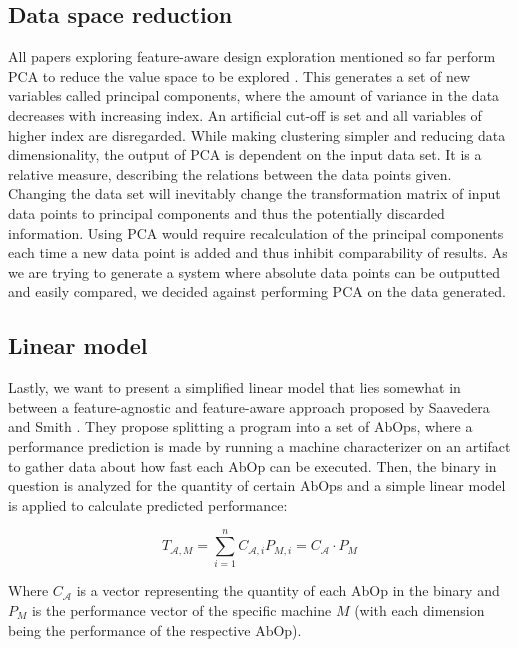 \documentclass[../bachelor_paper.tex]{subfiles}
\begin{document}
\subsection{Data space reduction}
All papers exploring feature-aware design exploration mentioned so far perform \acl{PCA} to reduce the value space to be explored \cite{phansalkarMeasuringProgramSimilarity2005,joshiMeasuringBenchmarkSimilarity2006,eeckhoutQuantifyingImpactInput2003}. This generates a set of new variables called principal components, where the amount of variance in the data decreases with increasing index. An artificial cut-off is set and all variables of higher index are disregarded. While making clustering simpler and reducing data dimensionality, the output of \ac{PCA} is dependent on the input data set. It is a relative measure, describing the relations between the data points given.  Changing the data set will inevitably change the transformation matrix of input data points to principal components and thus the potentially discarded information. Using \ac{PCA} would require recalculation of the principal components each time a new data point is added and thus inhibit comparability of results. As we are trying to generate a system where absolute data points can be outputted and easily compared, we decided against performing \ac{PCA} on the data generated.

\subsection{Linear model}
Lastly, we want to present a simplified linear model that lies somewhat in between a feature-agnostic and feature-aware approach proposed by Saavedera and Smith \cite{saavedraAnalysisBenchmarkCharacteristics1996}. They propose splitting a program into a set of \acp{AbOp}, where a performance prediction is made by running a machine characterizer on an artifact to gather data about how fast each \ac{AbOp} can be executed. Then, the binary in question is analyzed for the quantity of certain \acp{AbOp} and a simple linear model is applied to calculate predicted performance:

\begin{equation}
\label{eq:theo/simi/hybr/mode}
T_{\mathcal{A},M} = \sum^n_{i = 1}C_{\mathcal{A},i}P_{M,i} = C_\mathcal{A} \cdot P_M
\end{equation}

Where $C_{\mathcal{A}}$ is a vector representing the quantity of each \ac{AbOp} in the binary and $P_{M}$ is the performance vector of the specific machine $M$ (with each dimension being the performance of the respective \ac{AbOp}).
\end{document}

